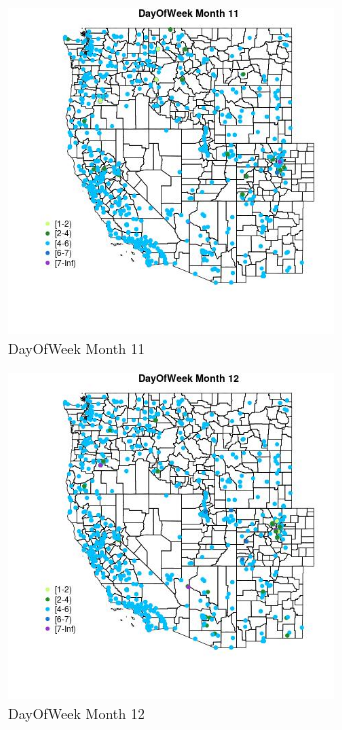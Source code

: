 \begin{figure} 
\centering  
\includegraphics[width=0.77\textwidth]{Code_Outputs/Report_ML_input_PM25_Step4_part_e_de_duplicated_aveswNAs_MapObsMo11DayOfWeek.jpg} 
\caption{\label{fig:Report_ML_input_PM25_Step4_part_e_de_duplicated_aveswNAsMapObsMo11DayOfWeek}DayOfWeek Month 11} 
\end{figure} 
 

\begin{figure} 
\centering  
\includegraphics[width=0.77\textwidth]{Code_Outputs/Report_ML_input_PM25_Step4_part_e_de_duplicated_aveswNAs_MapObsMo12DayOfWeek.jpg} 
\caption{\label{fig:Report_ML_input_PM25_Step4_part_e_de_duplicated_aveswNAsMapObsMo12DayOfWeek}DayOfWeek Month 12} 
\end{figure} 
 

